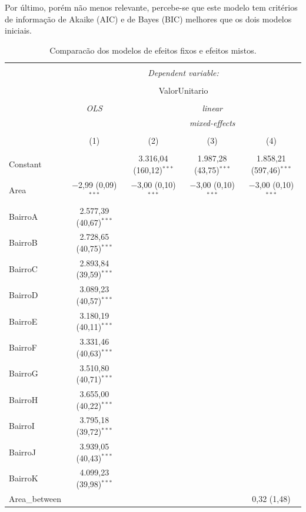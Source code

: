 \documentclass[
  a4paper, 12pt]{article}
\begin{document}
Por último, porém não menos relevante, percebe-se que este modelo tem
critérios de informação de Akaike (AIC) e de Bayes (BIC) melhores que os
dois modelos iniciais.

\begin{table}[H] \centering 
  \caption{Comparacão dos modelos de  efeitos fixos e efeitos mistos.} 
  \label{tab:fits} 
\scriptsize 
\begin{tabular}{@{\extracolsep{5pt}}lcccc} 
\\[-1.8ex]\hline 
\hline \\[-1.8ex] 
 & \multicolumn{4}{c}{\textit{Dependent variable:}} \\ 
\cline{2-5} 
\\[-1.8ex] & \multicolumn{4}{c}{ValorUnitario} \\ 
\\[-1.8ex] & \textit{OLS} & \multicolumn{3}{c}{\textit{linear}} \\ 
 & \textit{} & \multicolumn{3}{c}{\textit{mixed-effects}} \\ 
\\[-1.8ex] & (1) & (2) & (3) & (4)\\ 
\hline \\[-1.8ex] 
 Constant &  & 3.316,04 (160,12)$^{***}$ & 1.987,28 (43,75)$^{***}$ & 1.858,21 (597,46)$^{***}$ \\ 
  Area & $-$2,99 (0,09)$^{***}$ & $-$3,00 (0,10)$^{***}$ & $-$3,00 (0,10)$^{***}$ & $-$3,00 (0,10)$^{***}$ \\ 
  BairroA & 2.577,39 (40,67)$^{***}$ &  &  &  \\ 
  BairroB & 2.728,65 (40,75)$^{***}$ &  &  &  \\ 
  BairroC & 2.893,84 (39,59)$^{***}$ &  &  &  \\ 
  BairroD & 3.089,23 (40,57)$^{***}$ &  &  &  \\ 
  BairroE & 3.180,19 (40,11)$^{***}$ &  &  &  \\ 
  BairroF & 3.331,46 (40,63)$^{***}$ &  &  &  \\ 
  BairroG & 3.510,80 (40,71)$^{***}$ &  &  &  \\ 
  BairroH & 3.655,00 (40,22)$^{***}$ &  &  &  \\ 
  BairroI & 3.795,18 (39,72)$^{***}$ &  &  &  \\ 
  BairroJ & 3.939,05 (40,43)$^{***}$ &  &  &  \\ 
  BairroK & 4.099,23 (39,98)$^{***}$ &  &  &  \\ 
  Area\_between &  &  &  & 0,32 (1,48) \\ 

\end{tabular}
\end{table}
\end{document}
